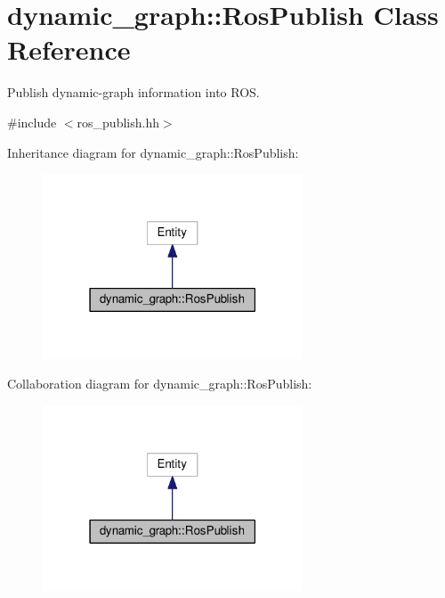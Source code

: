\hypertarget{classdynamic__graph_1_1RosPublish}{}\section{dynamic\+\_\+graph\+:\+:Ros\+Publish Class Reference}
\label{classdynamic__graph_1_1RosPublish}


Publish dynamic-\/graph information into R\+OS.  




{\ttfamily \#include $<$ros\+\_\+publish.\+hh$>$}



Inheritance diagram for dynamic\+\_\+graph\+:\+:Ros\+Publish\+:\nopagebreak
\begin{figure}[H]
\begin{center}
\leavevmode
\includegraphics[width=219pt]{classdynamic__graph_1_1RosPublish__inherit__graph}
\end{center}
\end{figure}


Collaboration diagram for dynamic\+\_\+graph\+:\+:Ros\+Publish\+:\nopagebreak
\begin{figure}[H]
\begin{center}
\leavevmode
\includegraphics[width=219pt]{classdynamic__graph_1_1RosPublish__coll__graph}
\end{center}
\end{figure}
